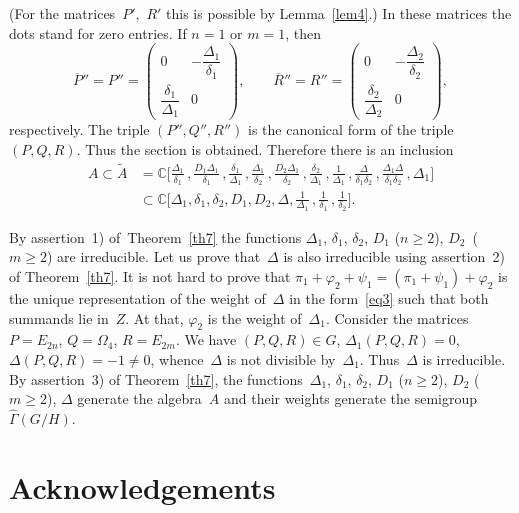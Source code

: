 \documentclass[12pt]{amsart}
\theoremstyle{definition}
\theoremstyle{remark}
\begin{document}
(For the matrices~$P'$,~$R'$ this is possible by Lemma~\ref{lem4}.)
In these matrices the dots stand for zero entries. If $n=1$ or
$m=1$, then
$$
\overline P{}''=P''=\begin{pmatrix} 0 & -\dfrac{\Delta_1}{\delta_1}
\\
\dfrac{\delta_1}{\Delta_1} & 0
\end{pmatrix},\qquad
\overline R{}''=R''=\begin{pmatrix} 0 & -\dfrac{\Delta_2}{\delta_2}
\\
\dfrac{\delta_2}{\Delta_2} & 0
\end{pmatrix},
$$
respectively. The triple $(P'', Q'', R'')$ is the canonical form of
the triple $(P,Q,R)$. Thus the section is obtained. Therefore there
is an inclusion
\begin{align*}
A\subset \tilde A&=\mathbb{C}\biggl[\frac{\Delta_1}{\delta_1}\,,
\frac{D_1\Delta_1}{\delta_1}\,,\frac{\delta_1}{\Delta_1}\,,
\frac{\Delta_1}{\delta_2}\,,\frac{D_2\Delta_1}{\delta_2}\,,
\frac{\delta_2}{\Delta_1}\,,\frac{1}{\Delta_1}\,,
\frac{\Delta}{\delta_1\delta_2}\,,\frac{\Delta_1\Delta}{\delta_1\delta_2}\,,
\Delta_1\biggr]
\\
&\subset\mathbb{C}\biggl[\Delta_1,\delta_1,\delta_2,D_1,D_2,\Delta,
\frac{1}{\Delta_1}\,,\frac{1}{\delta_1}\,,\frac{1}{\delta_2}\biggr].
\end{align*}

By assertion~1) of\, Theorem~\ref{th7} the functions $\Delta_1$,
$\delta_1$, $\delta_2$, $D_1$ ($n{\geqslant}2$), $D_2$~($m{\geqslant}2$) are
irreducible. Let us prove that~$\Delta$ is also irreducible using
assertion~2) of Theorem~\ref{th7}. It is not hard to prove that
$\pi_1+\varphi_2+\psi_1=(\pi_1+\psi_1)+\varphi_2$ is the unique
representation of the weight of~$\Delta$ in the form~\eqref{eq3}
such that both summands lie in~$Z$. At that, $\varphi_2$ is the
weight of~$\Delta_1$. Consider the matrices $P=E_{2n}$,
$Q=\Omega_4$, $R=E_{2m}$. We have $(P,Q,R)\in G$,
$\Delta_1(P,Q,R)=0$, $\Delta(P,Q,R)=-1\ne0$, whence~$\Delta$ is not
divisible by~$\Delta_1$. Thus~$\Delta$ is irreducible. By
assertion~3) of Theorem~\ref{th7}, the functions~$\Delta_1$,
$\delta_1$, $\delta_2$, $D_1$ ($n{\geqslant}2$), $D_2$ ($m{\geqslant}2$), $\Delta$
generate the algebra~$A$ and their weights generate the
semigroup~$\widehat\Gamma(G/H)$.

\section*{Acknowledgements}
\end{document}
